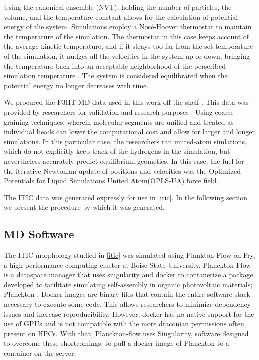 Using the canonical ensemble (NVT), holding the number of
particles, the volume, and the temperature constant allows for the calculation of 
potential energy of the system.  Simulations employ a
Nos\'{e}-Hoover thermostat to maintain the temperature of the simulation. The thermostat in this case keeps
account of the average kinetic temperature, and if it strays too far from the set temperature of the
simulation, it nudges all the velocities in the system up or down, bringing the temperature back into an
acceptable neighborhood of the perscribed simulation temperature \cite{Martyna1994d}\cite{Cao1996}.
The system is considered equilibrated when the potential energy no longer decreases with time. 

We procured the P3HT MD data used in this work off-the-shelf \cite{P3HTData}. This data was provided by
researchers for validation and research purposes \cite{Miller2018}. Using coarse-graining techniques, wherein
molecular segments are unified and treated as individual beads can lower the computational cost and allow for
larger and longer simulations. In this particular case, the researchers ran united-atom simlations, which do
not explicitly keep track of the hydrogens in the simulation, but nevertheless accurately predict equilibrium
geometies. In this case, the fuel for the iterative Newtonian update of positions and velocities 
was the Optimized Potentials for Liquid Simulations United Atom(OPLS-UA) force field.

The ITIC data was generated expressly for use in \autoref{itic}. In the following section we present the
procedure by which it was generated. 

\subsection{MD Software}
\label{planckton}

The ITIC morphology studied in \autoref{itic} was simulated using Plankton-Flow \cite{cmelab} on Fry, 
a high performance computing cluster at Boise State University. 
Planckton-Flow is a dataspace manager that uses
singularity \cite{singularity2017} and docker \cite{Merkel:2014:DLL:2600239.2600241} 
to contanerize a package developed to facilitate simulating self-assembly in
organic photovoltaic materials; Planckton \cite{cmelab}. Docker images are binary files that contain the
entire software stack necessary to execute some code. This allows researchers to minimize dependency issues
and increase reproducibility. However, docker has no native support for the use of GPUs and is not
compatible with the more draconian permissions often present on HPCs. With that, Planckton-flow uses 
Singularity, software designed to overcome these shortcomings,
to pull a docker image of Planckton to a container on the server. 

